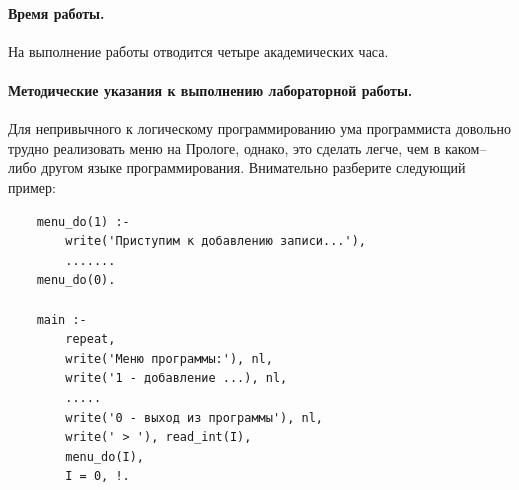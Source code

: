 \documentclass[12pt, openany, twoside]{book} %
\begin{document}
\paragraph{Время работы.} На выполнение работы отводится четыре академических часа.

\paragraph{Методические указания к выполнению лабораторной работы.} Для непривычного к логическому программированию ума программиста довольно трудно реализовать меню на Прологе, однако, это сделать легче, чем в каком--либо другом языке программирования. Внимательно разберите следующий пример:

{\tt\begin{verbatim}
    menu_do(1) :-
        write('Приступим к добавлению записи...'),
        .......
    menu_do(0).

    main :-
        repeat,
        write('Меню программы:'), nl,
        write('1 - добавление ...), nl,
        .....
        write('0 - выход из программы'), nl,
        write(' > '), read_int(I),
        menu_do(I),
        I = 0, !.
\end{verbatim}}
\end{document}
